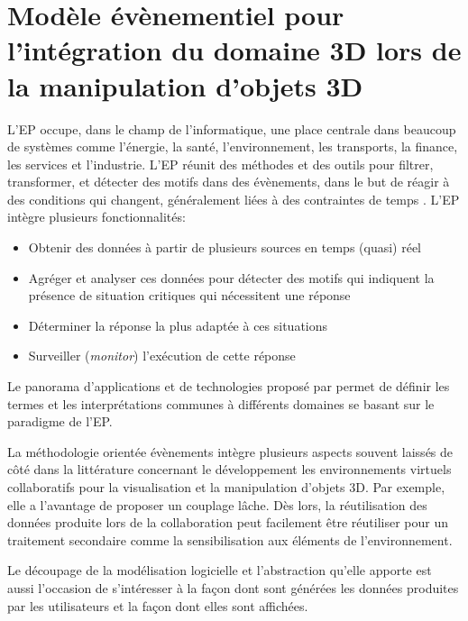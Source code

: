 
\section{Modèle évènementiel pour l'intégration du domaine 3D lors de la 
manipulation d'objets 3D}


L'\gls{EP} occupe, dans le champ de l'informatique, une place centrale dans 
beaucoup de systèmes comme l'énergie, la santé, l'environnement, les transports, 
la finance, les services et l'industrie. L'\gls{EP} réunit des méthodes et des outils 
pour filtrer, transformer, et détecter des motifs dans des évènements, dans le but 
de réagir à des conditions qui changent, généralement liées à des contraintes de 
temps \cite{Chandy2011}. L'\gls{EP} intègre plusieurs fonctionnalités:
\begin{itemize}
	\item Obtenir des données à partir de plusieurs sources en temps (quasi) réel
	\item Agréger et analyser ces données pour détecter des motifs qui indiquent la 
	présence de situation critiques qui nécessitent une réponse
	\item Déterminer la réponse la plus adaptée à ces situations
	\item Surveiller (\textit{monitor}) l'exécution de cette réponse
\end{itemize}

Le panorama d'applications et de technologies proposé par \cite{Hinze2009} 
permet de définir les termes et les interprétations communes à différents 
domaines se basant sur le paradigme de l'\gls{EP}. 


La méthodologie orientée évènements intègre plusieurs aspects souvent laissés 
de côté dans la littérature concernant le développement les environnements 
virtuels collaboratifs pour la visualisation et la manipulation d'objets 3D. Par 
exemple, elle a l'avantage de proposer un couplage lâche. Dès lors, la réutilisation 
des données produite lors de la collaboration peut facilement être réutiliser pour un 
traitement secondaire comme la sensibilisation aux éléments de l'environnement. 

Le découpage de la modélisation logicielle et l'abstraction qu'elle apporte est aussi 
l'occasion de s'intéresser à la façon dont sont générées les données produites par 
les utilisateurs et la façon dont elles sont affichées. 

